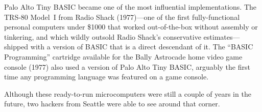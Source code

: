 Palo Alto Tiny BASIC became one of the most influential implementations.
The TRS-80 Model~I from Radio Shack (1977)---one of the first
fully-functional personal computers under \$1000 that worked
out-of-the-box without assembly or tinkering, and which wildly outsold
Radio Shack's conservative estimates---shipped with a version
of BASIC that is a direct descendant of it.
The ``BASIC Programming'' cartridge available for the Bally Astrocade
home video game console (1977) also used a version of Palo Alto Tiny
BASIC, arguably the first time any programming language was featured on
a game console.

Although these ready-to-run microcomputers were still a couple of years in
the future, two hackers from Seattle were able to see around that
corner.
